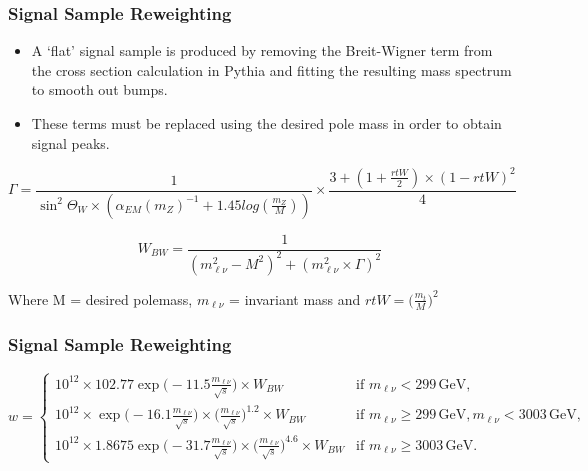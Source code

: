 \begin{frame}
	
		\frametitle{Signal Sample Reweighting}
		\vspace{30pt}
		
		\begin{itemize}
		
		\item A `flat' signal sample is produced by removing the Breit-Wigner term from the cross section calculation in Pythia and fitting the resulting mass spectrum to smooth out bumps. 
		\item These terms must be replaced using the desired pole mass in order to obtain signal peaks.
		\end{itemize}
		
\begin{equation*}
	\Gamma = \frac{1}{\sin^{2}\Theta_{W} \times ( \alpha_{EM}(m_{Z})^{-1} + 1.45 log( \frac{m_{Z}}{M}) )} \times \frac{3 + ( 1 + \frac{rtW}{2}) \times ( 1 - rtW )^{2} }{4}
\end{equation*}



\begin{equation*}
	W_{BW} = \frac{1}{(m_{\ell\nu}^{2} - M^{2})^{2} + (m_{\ell\nu}^{2} \times \Gamma)^{2}}
\end{equation*}

Where M = desired polemass, $m_{\ell\nu}$ = invariant mass and $rtW = \Big(\frac{m_{t}}{M}\Big)^{2}$
		
		
%		
%	
		
		
	
	\end{frame}
	
	
		\begin{frame}
	
		\frametitle{Signal Sample Reweighting}
		
		
	
		
		
		\begin{equation*}
  w = 
  \begin{cases}
    10^{12} \times 102.77 \exp\Big( -11.5 \frac{m_{\ell\nu}}{\sqrt{s}}\Big) \times W_{BW} & \text{if}\,\, m_{\ell\nu} < 299\, \text{GeV},\\
    10^{12} \times \exp\Big( -16.1 \frac{m_{\ell\nu}}{\sqrt{s}}\Big) \times \Big(\frac{m_{\ell\nu}}{\sqrt{s}}\Big)^{1.2} \times W_{BW} & \text{if}\,\, m_{\ell\nu} \geqslant 299\, \text{GeV}, m_{\ell\nu} < 3003\, \text{GeV},\\
    10^{12} \times 1.8675 \exp\Big( -31.7 \frac{m_{\ell\nu}}{\sqrt{s}}\Big) \times \Big(\frac{m_{\ell\nu}}{\sqrt{s}}\Big)^{4.6} \times W_{BW} & \text{if}\,\, m_{\ell\nu} \geqslant 3003\, \text{GeV}.
  \end{cases}
\end{equation*}

		
	
	\end{frame}